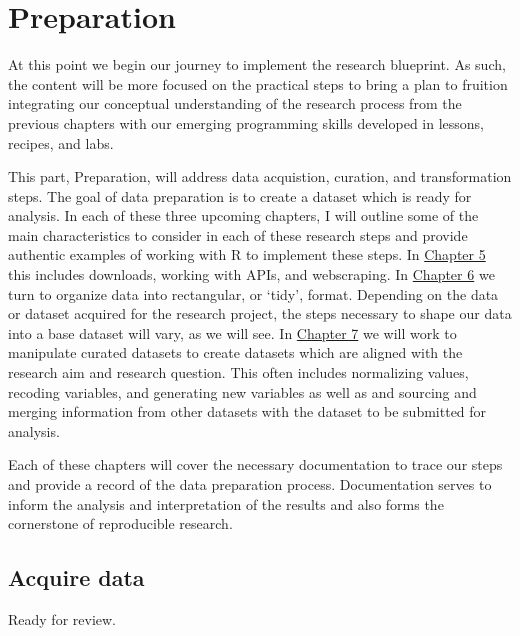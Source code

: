 \documentclass[
  letterpaper,
  DIV=11,
  numbers=noendperiod]{scrreport}
\theoremstyle{definition}
\theoremstyle{remark}
\begin{document}
\part{Preparation}

At this point we begin our journey to implement the research blueprint.
As such, the content will be more focused on the practical steps to
bring a plan to fruition integrating our conceptual understanding of the
research process from the previous chapters with our emerging
programming skills developed in lessons, recipes, and labs.

This part, Preparation, will address data acquistion, curation, and
transformation steps. The goal of data preparation is to create a
dataset which is ready for analysis. In each of these three upcoming
chapters, I will outline some of the main characteristics to consider in
each of these research steps and provide authentic examples of working
with R to implement these steps. In
\protect\hyperlink{sec-acquire-data}{Chapter 5} this includes downloads,
working with APIs, and webscraping. In
\protect\hyperlink{sec-curate-data}{Chapter 6} we turn to organize data
into rectangular, or `tidy', format. Depending on the data or dataset
acquired for the research project, the steps necessary to shape our data
into a base dataset will vary, as we will see. In
\protect\hyperlink{sec-transform-data}{Chapter 7} we will work to
manipulate curated datasets to create datasets which are aligned with
the research aim and research question. This often includes normalizing
values, recoding variables, and generating new variables as well as and
sourcing and merging information from other datasets with the dataset to
be submitted for analysis.

Each of these chapters will cover the necessary documentation to trace
our steps and provide a record of the data preparation process.
Documentation serves to inform the analysis and interpretation of the
results and also forms the cornerstone of reproducible research.

\hypertarget{sec-acquire-data}{%
\chapter{Acquire data}\label{sec-acquire-data}}

\begin{tcolorbox}[enhanced jigsaw, breakable, arc=.35mm, rightrule=.15mm, coltitle=black, title=\textcolor{quarto-callout-tip-color}{\faLightbulb}\hspace{0.5em}{Draft}, bottomtitle=1mm, leftrule=.75mm, toptitle=1mm, titlerule=0mm, opacitybacktitle=0.6, toprule=.15mm, colback=white, colframe=quarto-callout-tip-color-frame, left=2mm, bottomrule=.15mm, opacityback=0, colbacktitle=quarto-callout-tip-color!10!white]

Ready for review.

\end{tcolorbox}
\end{document}
